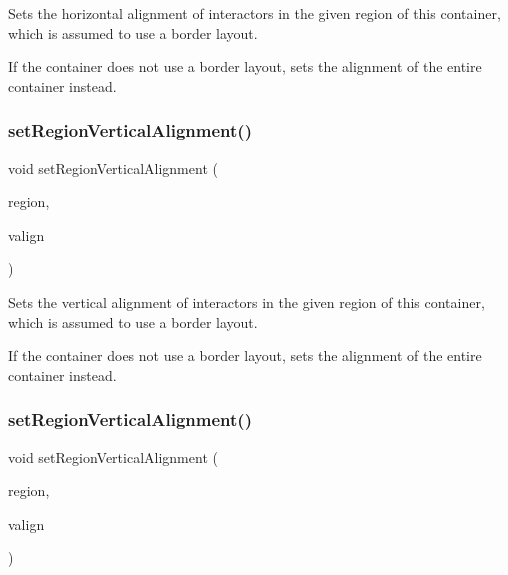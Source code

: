 Sets the horizontal alignment of interactors in the given region of this container, which is assumed to use a border layout. 

If the container does not use a border layout, sets the alignment of the entire container instead. \mbox{\label{classsgl_1_1GContainer_afbe22d897ce8ef25db52cbc3d456aa0a}} 
\subsubsection{\texorpdfstring{set\+Region\+Vertical\+Alignment()}{setRegionVerticalAlignment()}\hspace{0.1cm}{\footnotesize\ttfamily [1/2]}}
{\footnotesize\ttfamily void set\+Region\+Vertical\+Alignment (\begin{DoxyParamCaption}\item[{const std\+::string \&}]{region,  }\item[{const std\+::string \&}]{valign }\end{DoxyParamCaption})\hspace{0.3cm}{\ttfamily [virtual]}}



Sets the vertical alignment of interactors in the given region of this container, which is assumed to use a border layout. 

If the container does not use a border layout, sets the alignment of the entire container instead. \mbox{\label{classsgl_1_1GContainer_a1efb2d3b67fb479aad27a6c0032ee70e}} 
\subsubsection{\texorpdfstring{set\+Region\+Vertical\+Alignment()}{setRegionVerticalAlignment()}\hspace{0.1cm}{\footnotesize\ttfamily [2/2]}}
{\footnotesize\ttfamily void set\+Region\+Vertical\+Alignment (\begin{DoxyParamCaption}\item[{\mbox{\hyperlink{classsgl_1_1GContainer_a81a01a86de31071a92e6cce0bab9bc4b}{Region}}}]{region,  }\item[{\mbox{\hyperlink{namespacesgl_a9c2ed22cfbd21f13df24ea193b310aee}{Vertical\+Alignment}}}]{valign }\end{DoxyParamCaption})\hspace{0.3cm}{\ttfamily [virtual]}}



